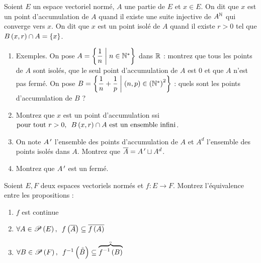 \begin{exoss}[Exercice 18]
Soient \(E\) un espace vectoriel normé, \(A\) une partie de \(E\) et \(x\in E\). On dit que \(x\) est un point d'accumulation de \(A\) quand il existe une suite injective de \(A^{\mathbb{N}}\) qui converge vers \(x\). On dit que \(x\) est un point isolé de \(A\) quand il existe \(r>0\) tel que \(B\left(x,r\right)\cap A=\left\lbrace x\right\rbrace\).

\begin{enumerate}
    \item Exemples. On pose \(A=\left\lbrace\dfrac{1}{n}\;\middle|\; n\in\mathbb{N}^*\right\rbrace\) dans \(\mathbb{R}\) : montrez que tous les points de \(A\) sont isolés, que le seul point d'accumulation de \(A\) est \(0\) et que \(A\) n'est pas fermé. On pose \(B=\left\lbrace\dfrac{1}{n}+\dfrac{1}{p}\;\middle|\;\left(n,p\right)\in\left(\mathbb{N}^*\right)^2\right\rbrace\) : quels sont les points d'accumulation de \(B\) ? \\
    \item Montrez que \(x\) est un point d'accumulation ssi \(\quantifs{\text{pour tout }r>0}\bouleo{x}{r}\inter A\text{ est un ensemble infini}\). \\
    \item On note \(A^{\,\prime}\) l'ensemble des points d'accumulation de \(A\) et \(A^d\) l'ensemble des points isolés dans \(A\). Montrez que \(\overline{A}=A^{\,\prime}\sqcup A^d\). \\
    \item Montrez que \(A^{\,\prime}\) est un fermé.
\end{enumerate}
\end{exoss}

\begin{corr}
\end{corr}

\begin{exoss}[Exercice 19]
Soient \(E,F\) deux espaces vectoriels normés et \(f:E\to F\). Montrez l'équivalence entre les propositions :

\begin{enumerate}
    \item \(f\) est continue \\
    \item \(\quantifs{\forall A\in\P{E}}f\paren{\conj{A}}\subset\conj{f\paren{A}}\) \\
    \item \(\quantifs{\forall B\in\P{F}}f\inv\paren{\interieur{B}}\subset\interieur{\overbrace{f\inv\paren{B}}}\)
\end{enumerate}
\end{exoss}

